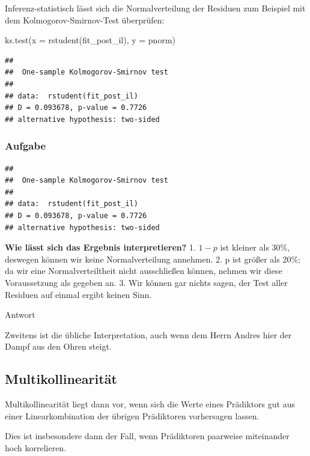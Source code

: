 \documentclass[
]{book}
\newenvironment{Shaded}{\begin{snugshade}}{\end{snugshade}}
\newcommand{\AttributeTok}[1]{\textcolor[rgb]{0.77,0.63,0.00}{#1}}
\newcommand{\FunctionTok}[1]{\textcolor[rgb]{0.00,0.00,0.00}{#1}}
\newcommand{\NormalTok}[1]{#1}
\newcommand{\StringTok}[1]{\textcolor[rgb]{0.31,0.60,0.02}{#1}}
\begin{document}
Inferenz-statistisch lässt sich die Normalverteilung der Residuen zum Beispiel mit dem Kolmogorov-Smirnov-Test überprüfen:

\begin{Shaded}
\begin{Highlighting}[]
\FunctionTok{ks.test}\NormalTok{(}\AttributeTok{x =} \FunctionTok{rstudent}\NormalTok{(fit\_post\_il),}
        \AttributeTok{y =} \StringTok{\textquotesingle{}pnorm\textquotesingle{}}\NormalTok{)}
\end{Highlighting}
\end{Shaded}

\begin{verbatim}
## 
##  One-sample Kolmogorov-Smirnov test
## 
## data:  rstudent(fit_post_il)
## D = 0.093678, p-value = 0.7726
## alternative hypothesis: two-sided
\end{verbatim}

\hypertarget{aufgabe-5}{%
\subsubsection{Aufgabe}\label{aufgabe-5}}

\begin{verbatim}
## 
##  One-sample Kolmogorov-Smirnov test
## 
## data:  rstudent(fit_post_il)
## D = 0.093678, p-value = 0.7726
## alternative hypothesis: two-sided
\end{verbatim}

\textbf{Wie lässt sich das Ergebnis interpretieren?}
1. \(1-p\) ist kleiner als 30\%, deswegen können wir keine Normalverteilung annehmen.
2. p ist größer als 20\%; da wir eine Normalverteiltheit nicht ausschließen können, nehmen wir diese Voraussetzung als gegeben an.
3. Wir können gar nichts sagen, der Test aller Residuen auf einmal ergibt keinen Sinn.

Antwort

Zweitens ist die übliche Interpretation, auch wenn dem Herrn Andres hier der Dampf aus den Ohren steigt.

\hypertarget{multikollinearituxe4t}{%
\subsection{Multikollinearität}\label{multikollinearituxe4t}}

Multikollinearität liegt dann vor, wenn sich die Werte eines Prädiktors gut aus einer Linearkombination
der übrigen Prädiktoren vorhersagen lassen.

Dies ist insbesondere dann der Fall, wenn Prädiktoren paarweise
miteinander hoch korrelieren.
\end{document}
